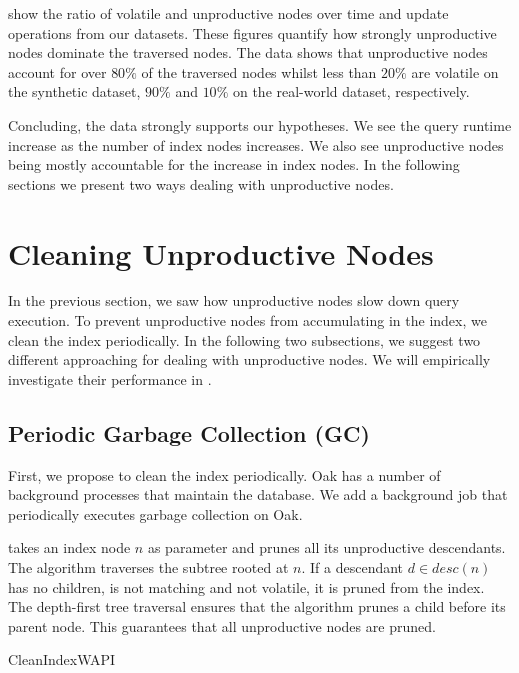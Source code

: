 \message{ !name(thesis.tex)}\documentclass[abstracton,12pt]{scrartcl}
\theoremstyle{definition}
\begin{document}
show the ratio of volatile and unproductive nodes over time and update
operations from our datasets. These figures quantify how strongly unproductive
nodes dominate the traversed nodes. The data shows that unproductive nodes
account for over $80\%$ of the traversed nodes whilst less than $20\%$ are
volatile on the synthetic dataset, $90\%$ and $10\%$ on the real-world dataset,
respectively.

Concluding, the data strongly supports our hypotheses. We see the query runtime
increase as the number of index nodes increases. We also see unproductive nodes
being mostly accountable for the increase in index nodes. 
In the following sections we present two ways dealing with unproductive nodes.

\newpage

\section{Cleaning Unproductive Nodes}

In the previous section, we saw how unproductive nodes slow down query
execution. To prevent unproductive nodes from accumulating in the index, we
clean the index periodically. In the following two subsections, we suggest two
different approaching for dealing with unproductive nodes. We will empirically
investigate their performance in .

\subsection{Periodic Garbage Collection (GC)}

First, we propose to clean the index periodically.  Oak has a number of background processes that
maintain the database. We add a background job that periodically executes
garbage collection on Oak.

 takes an index node $n$ as parameter and prunes all
its unproductive descendants. The algorithm traverses
the subtree rooted at $n$. If a descendant $d \in desc(n)$ has no children, is
not matching and not
volatile, it is pruned from the index. The depth-first tree traversal ensures
that the algorithm prunes a child before its parent node. This guarantees that
all unproductive nodes are pruned.

\begin{algorithm}
  \caption{CleanIndexWAPI}
  \DontPrintSemicolon
  \label{algo:periodic_gc_wapi}
\end{algorithm}
\end{document}
